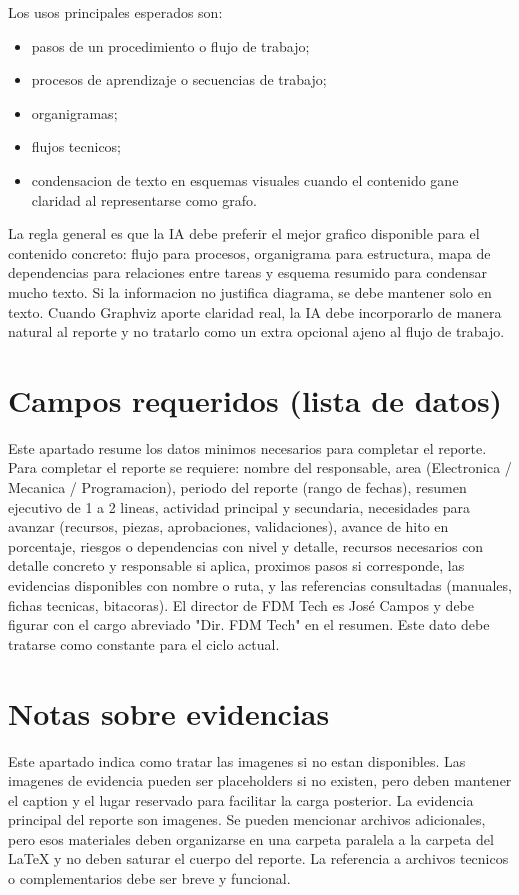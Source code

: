 \documentclass[11pt,a4paper]{article}
\begin{document}
Los usos principales esperados son:
\begin{itemize}
  \item pasos de un procedimiento o flujo de trabajo;
  \item procesos de aprendizaje o secuencias de trabajo;
  \item organigramas;
  \item flujos tecnicos;
  \item condensacion de texto en esquemas visuales cuando el contenido gane
  claridad al representarse como grafo.
\end{itemize}

La regla general es que la IA debe preferir el mejor grafico disponible para el
contenido concreto: flujo para procesos, organigrama para estructura, mapa de
dependencias para relaciones entre tareas y esquema resumido para condensar
mucho texto. Si la informacion no justifica diagrama, se debe mantener solo en
texto. Cuando Graphviz aporte claridad real, la IA debe incorporarlo de manera
natural al reporte y no tratarlo como un extra opcional ajeno al flujo de
trabajo.

\section{Campos requeridos (lista de datos)}
Este apartado resume los datos minimos necesarios para completar el reporte.
Para completar el reporte se requiere: nombre del responsable, area
(Electronica / Mecanica / Programacion), periodo del reporte (rango de fechas),
resumen ejecutivo de 1 a 2 lineas, actividad principal y secundaria,
necesidades para avanzar (recursos, piezas, aprobaciones, validaciones), avance
de hito en porcentaje, riesgos o dependencias con nivel y detalle, recursos
necesarios con detalle concreto y responsable si aplica, proximos pasos si
corresponde, las evidencias disponibles con nombre o ruta, y las referencias
consultadas (manuales, fichas tecnicas, bitacoras).
El director de FDM Tech es José Campos y debe figurar con el
cargo abreviado "Dir. FDM Tech" en el resumen. Este dato debe tratarse como
constante para el ciclo actual.

\section{Notas sobre evidencias}
Este apartado indica como tratar las imagenes si no estan disponibles. Las
imagenes de evidencia pueden ser placeholders si no existen, pero deben
mantener el caption y el lugar reservado para facilitar la carga posterior.
La evidencia principal del reporte son imagenes. Se pueden mencionar archivos
adicionales, pero esos materiales deben organizarse en una carpeta paralela a
la carpeta del LaTeX y no deben saturar el cuerpo del reporte. La referencia a
archivos tecnicos o complementarios debe ser breve y funcional.
\end{document}
